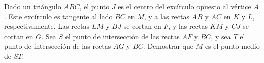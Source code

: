 Dado un triángulo $ABC$, el punto $J$ es el centro del excírculo opuesto al vértice $A$. Este excírculo es tangente al lado $BC$ en $M$, y a las rectas $AB$ y $AC$ en $K$ y $L$, respectivamente. Las rectas $LM$ y $BJ$ se cortan en $F$, y las rectas $KM$ y $CJ$ se cortan en $G$. Sea $S$ el punto de intersección de las rectas $AF$ y $BC$, y sea $T$ el punto de intersección de las rectas $AG$ y $BC$.  \newline 
Demostrar que $M$ es el punto medio de $ST$.